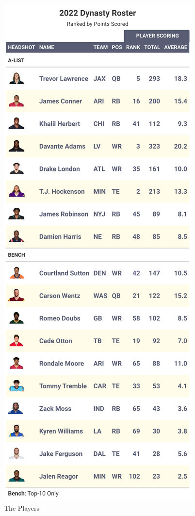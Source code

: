 \documentclass[
]{article}
\begin{document}
\begin{figure}
\includegraphics[width=0.75\linewidth,height=0.75\textheight]{output/2022/dynasty_roster_Slobonmynoblin} \caption{The Players}\label{fig:unnamed-chunk-39}
\end{figure}
\newpage
\end{document}
